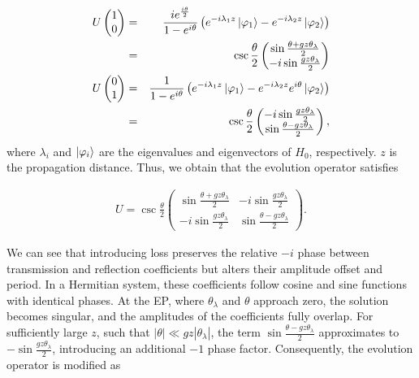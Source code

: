 \documentclass[%
reprint,
superscriptaddress,
amsthm,amsmath,amssymb,
aps,
]{revtex4-1}
\begin{document}
\begin{eqnarray}
	U\begin{pmatrix} 1 \\ 0	\end{pmatrix}&=&\frac{i e^{\frac{i \theta}{2}}}{ 1-e^{i \theta}} \left( e^{-i \lambda_{1}z}\ket{\varphi_{1}} -e^{-i \lambda_{2}z}\ket{\varphi_{2}}\right)\nonumber\\
	&=&\csc\frac{\theta}{2}\begin{pmatrix} \sin \frac{\theta+gz\theta_{\lambda}}{2} \\ -i \sin \frac{gz\theta_{\lambda}}{2} \end{pmatrix}\nonumber\\
	U\begin{pmatrix} 0 \\ 1	\end{pmatrix}&=&\frac{1}{ 1-e^{i \theta}} \left( e^{-i \lambda_{1}z} \ket{\varphi_{1}} - e^{-i \lambda_{2}z} e^{i \theta} \ket{\varphi_{2}}\right)\nonumber\\
	&=&\csc\frac{\theta}{2}\begin{pmatrix}	-i \sin \frac{gz\theta_{\lambda}}{2} \\ \sin \frac{\theta-gz\theta_{\lambda}}{2} \end{pmatrix}\label{11},
\end{eqnarray}
where $ \lambda_{i}$ and $\ket{\varphi_{i}} $ are the eigenvalues and eigenvectors of $H_0$, respectively. $z$ is the propagation distance. Thus, we obtain that the evolution operator satisfies
 


\begin{eqnarray}
	U= \csc\frac{\theta}{2}\begin{pmatrix} \sin \frac{\theta+gz\theta_{\lambda}}{2} & -i \sin \frac{gz\theta_{\lambda}}{2} \\	-i \sin \frac{gz\theta_{\lambda}}{2} & \sin \frac{\theta-gz\theta_{\lambda}}{2} \end{pmatrix} .
\end{eqnarray}

We can see that introducing loss preserves the relative $-i$ phase between transmission and reflection coefficients but alters their amplitude offset and period. In a Hermitian system, these coefficients follow cosine and sine functions with identical phases. At the EP, where $\theta_{\lambda}$ and $\theta$ approach zero, the solution becomes singular, and the amplitudes of the coefficients fully overlap. For sufficiently large $z$, such that $|\theta|\ll gz|\theta_{\lambda}|$, the term $\sin \frac{\theta - gz\theta_{\lambda}}{2}$ approximates to $-\sin \frac{gz\theta_{\lambda}}{2}$, introducing an additional $-1$ phase factor. Consequently, the evolution operator is modified as
\end{document}
